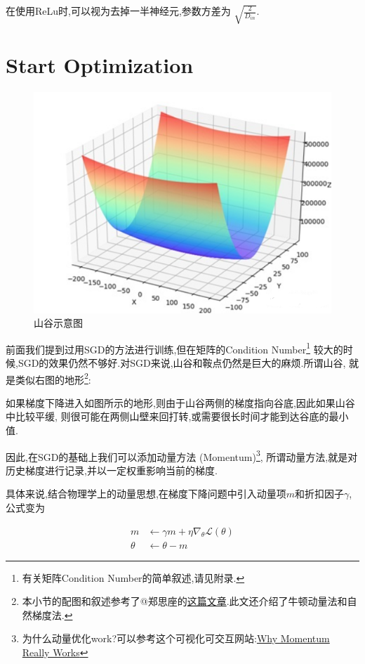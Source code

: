 在使用ReLu时,可以视为去掉一半神经元,参数方差为 $\sqrt{\frac{2}{D_{in}}}$.

\section{Start Optimization}

\begin{figure}[htbp]
	\centering
	\includegraphics[scale=0.55]{figures/valley.png}
	\caption{山谷示意图}
	\label{valley}
\end{figure}

前面我们提到过用SGD的方法进行训练,但在矩阵的Condition Number\footnote{有关矩阵Condition Number的简单叙述,请见附录.}
较大的时候,SGD的效果仍然不够好.对SGD来说,山谷和鞍点仍然是巨大的麻烦.所谓山谷,
就是类似右图的地形\footnote{本小节的配图和叙述参考了@郑思座的\href{https://zhuanlan.zhihu.com/p/60088231}{这篇文章}.此文还介绍了牛顿动量法和自然梯度法.}:

如果梯度下降进入如图所示的地形,则由于山谷两侧的梯度指向谷底,因此如果山谷中比较平缓,
则很可能在两侧山壁来回打转,或需要很长时间才能到达谷底的最小值.

因此,在SGD的基础上我们可以添加动量方法 (Momentum)\footnote{为什么动量优化work?可以参考这个可视化可交互网站:\href{http://distill.pub/2017/momentum}{Why Momentum Really Works}},
所谓动量方法,就是对历史梯度进行记录,并以一定权重影响当前的梯度.

具体来说,结合物理学上的动量思想,在梯度下降问题中引入动量项$m$和折扣因子$\gamma$,公式变为 

\begin{equation}
	\begin{aligned}
		m &\leftarrow \gamma m+\eta \nabla_{\theta} \mathcal L(\theta)
		\\
		\theta &\leftarrow \theta-m
	\end{aligned}
\end{equation}

